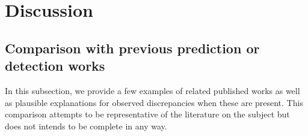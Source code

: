\documentclass{aa}
\begin{document}
\begin{table*}
\setlength{\tabcolsep}{3pt}
\caption{Predicted and original properties for the $5$ sources in Stripe 82 with the highest predicted redshift on the unlabelled sources predicted to be Radio AGN. A description of the columns is presented in Appendix~\ref{sec:app_prediction_results}.}\label{table:pred_radio_AGN_unknown_S82}
\centering
{}
\end{table*}

\section{Discussion}\label{sec:discussion}

\subsection{Comparison with previous prediction or detection works}\label{sec:compare_previous_works}
In this subsection, we provide a few examples of related published works as well as plausible explanations for observed discrepancies when these are present. This comparison attempts to be representative of the literature on the subject but does not intends to be complete in any way.
\end{document}
